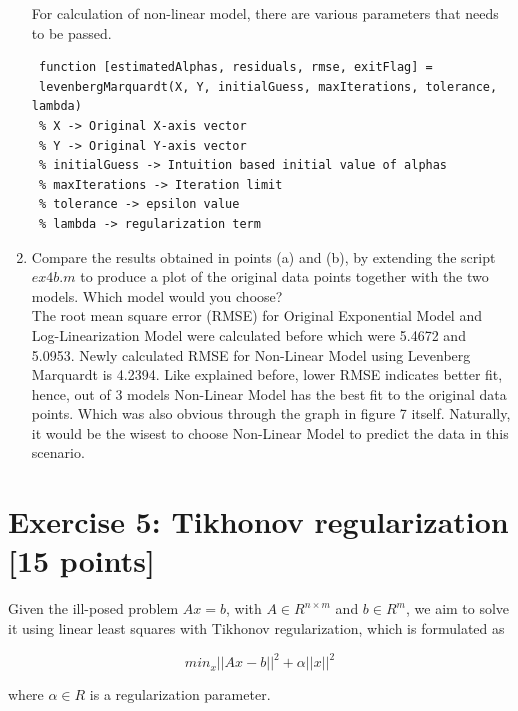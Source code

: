 \documentclass[unicode,11pt,a4paper,oneside,numbers=endperiod,openany]{scrartcl}
\newcommand{\norm}[1]{\lvert\lvert #1 \rvert\rvert}
\begin{document}
\begin{enumerate}[label=(\alph*)]
For calculation of non-linear model, there are various parameters that needs to be passed.\\

\begin{lstlisting}
 function [estimatedAlphas, residuals, rmse, exitFlag] = 
 levenbergMarquardt(X, Y, initialGuess, maxIterations, tolerance, lambda)
 % X -> Original X-axis vector
 % Y -> Original Y-axis vector
 % initialGuess -> Intuition based initial value of alphas
 % maxIterations -> Iteration limit
 % tolerance -> epsilon value
 % lambda -> regularization term
\end{lstlisting}


\item Compare the results obtained in points (a) and (b), by extending the script ${ex4b.m}$ to produce a plot of the
original data points together with the two models. Which model would you choose? \\

The root mean square error (RMSE) for Original Exponential Model and Log-Linearization Model were calculated before which were 5.4672 and 5.0953. Newly calculated RMSE for Non-Linear Model using Levenberg Marquardt is 4.2394. Like explained before, lower RMSE indicates better fit, hence, out of 3 models Non-Linear Model has the best fit to the original data points. Which was also obvious through the graph in figure 7 itself. Naturally, it would be the wisest to choose Non-Linear Model to predict the data in this scenario.

\end{enumerate}


\section*{Exercise 5: Tikhonov regularization [15 points]}
Given the ill-posed problem ${Ax = b}$, with ${A \in R^{n\times m}}$ and ${b \in R^m}$, we aim to solve it using linear
least squares with Tikhonov regularization, which is formulated as

\begin{equation}
 min_x \norm{Ax - b}^2 + \alpha \norm{x}^2
\end{equation}

where ${\alpha \in R}$ is a regularization parameter.
\end{document}
